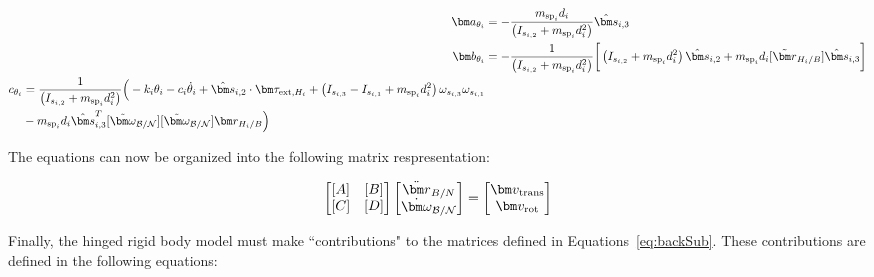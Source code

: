 \begin{subequations}
	\begin{align}
	\bm a_{\theta_i} &= - \frac{m_{\text{sp}_i} d_i}{\left( I_{s_{i,2}} + m_{\text{sp}_i} d_i^{2} \right)} \hat{\bm s}_{i,3}
	\label{eq:solar_panel_final11}
	\\
	\bm b_{\theta_i} &= -\frac{1}{\left( I_{s_{i,2}} + m_{\text{sp}_i} d_i^{2} \right)} \bigg[\left(I_{s_{i,2}} + m_{\text{sp}_i}d_i^{2}\right) \hat{\bm s}_{i,2}+m_{\text{sp}_i} d_i [\tilde{\bm r}_{H_i/B}] \hat{\bm s}_{i,3}\bigg]
	\\
	\begin{split}
	c_{\theta_i} &= \frac{1}{\left( I_{s_{i,2}} + m_{\text{sp}_i} d_i^{2} \right)} \Big(- k_i \theta_i - c_i \dot\theta_i + \hat{\bm s}_{i,2} \cdot \bm \tau_{\text{ext},H_i} + \left( I_{s_{i,3}} - I_{s_{i,1}} + m_{\text{sp}_i}d_i^{2}\right) \omega_{s_{i,3}} \omega_{s_{i,1}} \\
	&- m_{\text{sp}_i} d_i \hat{\bm s}_{i,3}^{T} [\tilde{\bm\omega}_{\cal B/N}][\tilde{\bm\omega}_{\cal B/N}] \bm r_{H_i/B}\Big)
	\label{eq:solar_panel_final6}
	\end{split}
	\end{align}
\end{subequations}

The equations can now be organized into the following matrix respresentation:

\begin{equation}
\begin{bmatrix}
[A] & [B]\\
[C] & [D]
\end{bmatrix} \begin{bmatrix}
\ddot{\bm r}_{B/N}\\
\dot{\bm\omega}_{\cal B/N}
\end{bmatrix} = \begin{bmatrix}
\bm v_{\text{trans}}\\
\bm v_{\text{rot}}
\end{bmatrix}
\label{eq:backSub}
\end{equation}

Finally, the hinged rigid body model must make ``contributions" to the matrices defined in Equations~\eqref{eq:backSub}. These contributions are defined in the following equations: 

